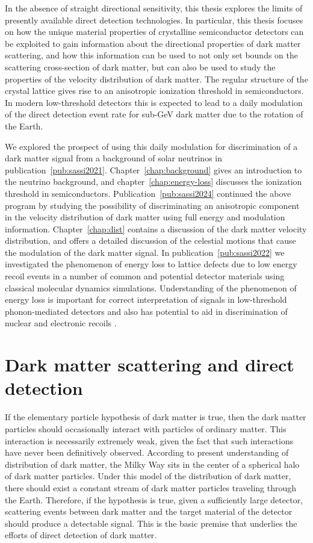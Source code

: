 \documentclass[b5paper, 10pt, twoside]{book}
\begin{document}
In the absence of straight directional sensitivity, this thesis explores the limits of presently available direct detection technologies. In particular, this thesis focuses on how the unique material properties of crystalline semiconductor detectors can be exploited to gain information about the directional properties of dark matter scattering, and how this information can be used to not only set bounds on the scattering cross-section of dark matter, but can also be used to study the properties of the velocity distribution of dark matter. The regular structure of the crystal lattice gives rise to an anisotropic ionization threshold in semiconductors. In modern low-threshold detectors this is expected to lead to a daily modulation of the direct detection event rate for sub-GeV dark matter due to the rotation of the Earth. 

We explored the prospect of using this daily modulation for discrimination of a dark matter signal from a background of solar neutrinos in publication~\ref{pub:sassi2021}. Chapter~\ref{chap:background} gives an introduction to the neutrino background, and chapter~\ref{chap:energy-loss} discusses the ionization threshold in semiconductors. Publication~\ref{pub:sassi2024} continued the above program by studying the possibility of discriminating an anisotropic component in the velocity distribution of dark matter using full energy and modulation information. Chapter~\ref{chap:dist} contains a discussion of the dark matter velocity distribution, and offers a detailed discussion of the celestial motions that cause the modulation of the dark matter signal. In publication~\ref{pub:sassi2022} we investigated the phenomenon of energy loss to lattice defects due to low energy recoil events in a number of common and potential detector materials using classical molecular dynamics simulations. Understanding of the phenomenon of energy loss is important for correct interpretation of signals in low-threshold phonon-mediated detectors and also has potential to aid in discrimination of nuclear and electronic recoils \parencite{HeikinheimoEtAl2022}.

\chapter{Dark matter scattering and direct detection}
\label{chap:direct-detection}

If the elementary particle hypothesis of dark matter is true, then the dark matter particles should occasionally interact with particles of ordinary matter. This interaction is necessarily extremely weak, given the fact that such interactions have never been definitively observed. According to present understanding of distribution of dark matter, the Milky Way sits in the center of a spherical halo of dark matter particles. Under this model of the distribution of dark matter, there should exist a constant stream of dark matter particles traveling through the Earth. Therefore, if the hypothesis is true, given a sufficiently large detector, scattering events between dark matter and the target material of the detector should produce a detectable signal. This is the basic premise that underlies the efforts of direct detection of dark matter.
\end{document}
